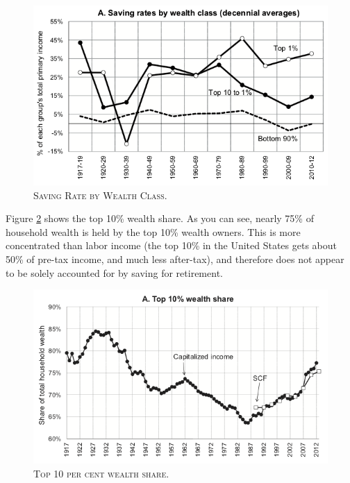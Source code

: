 \documentclass[]{book}
\theoremstyle{definition}
\theoremstyle{definition}
\theoremstyle{definition}
\theoremstyle{remark}
\begin{document}
\begin{figure}

{\centering \includegraphics[width=1\linewidth]{figures/fig9a} 

}

\caption{\textsc{Saving Rate by Wealth Class}.}\label{fig:saez-zucman-fig9a}
\end{figure}

Figure \ref{fig:saez-zucman-fig6a} shows the top 10\% wealth share. As
you can see, nearly 75\% of household wealth is held by the top 10\%
wealth owners. This is more concentrated than labor income (the top 10\%
in the United States gets about 50\% of pre-tax income, and much less
after-tax), and therefore does not appear to be solely accounted for by
saving for retirement.



\begin{figure}

{\centering \includegraphics[width=1\linewidth]{figures/fig6a} 

}

\caption{\textsc{Top 10 per cent wealth share}.}\label{fig:saez-zucman-fig6a}
\end{figure}
\end{document}
